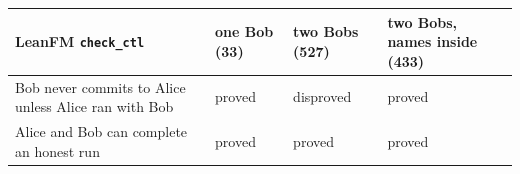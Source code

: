 \begin{tabular}{p{}lll}
\toprule
LeanFM \texttt{check\_ctl} & one Bob (33) & two Bobs (527) & two Bobs, names inside (433) \\
\midrule
Bob never commits to Alice unless Alice ran with Bob & proved & disproved & proved \\
Alice and Bob can complete an honest run & proved & proved & proved \\
\bottomrule
\end{tabular}
